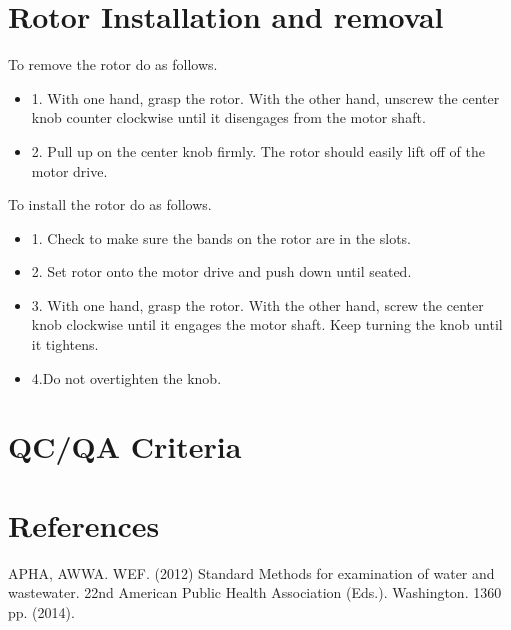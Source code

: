 \documentclass[12pt]{../SOP3_beta}
\begin{document}
\section{Rotor Installation and removal}

\NP To remove the rotor do as follows.
\begin{itemize}
  \item 1. With one hand, grasp the rotor. With the other hand, unscrew the center knob counter clockwise until it disengages from the motor shaft.
  \item 2. Pull up on the center knob firmly. The rotor should easily lift off of the motor drive.
\end{itemize}

\NP To install the rotor do as follows.
\begin{itemize}
  \item 1. Check to make sure the bands on the rotor are in the slots.
  \item 2. Set rotor onto the motor drive and push down until seated.
  \item 3. With one hand, grasp the rotor. With the other hand, screw the center knob clockwise until it engages the motor shaft. Keep turning the knob until it tightens.
  \item 4.Do not overtighten the knob.
\end{itemize}


\section{QC/QA Criteria}

\section{References}

\NP APHA, AWWA. WEF. (2012) Standard Methods for examination of water and wastewater. 22nd American Public Health Association (Eds.). Washington. 1360 pp. (2014).
\end{document}
